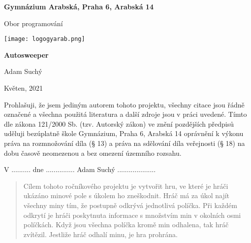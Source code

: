 
\begin{titlepage}
\begin{center}
\large \vspace*{\fill}
\thispagestyle{empty}

\LARGE

{ \huge \textbf{Gymnázium Arabská, Praha 6, Arabská 14}}

{\LARGE Obor programování }

\vfill
\texttt{[image: logogyarab.png]}
\vspace{15pt}

\vfill

{\huge \textbf{Autosweeper}}

\vfill

Adam Suchý

\vfill

{\large Květen, 2021}

\vspace*{\fill}
\end{center}
\end{titlepage}

\thispagestyle{empty}
\addtocounter{page}{-1}
\vspace*{\fill}
Prohlašuji, že jsem jediným autorem tohoto projektu, všechny citace jsou řádně označené a všechna 
použitá literatura a další zdroje jsou v práci uvedené. Tímto dle zákona 121/2000 Sb. (tzv. Autorský zákon) 
ve znění pozdějších předpisů uděluji bezúplatně škole Gymnázium, Praha 6, Arabská 14 oprávnění k výkonu 
práva na rozmnožování díla (§ 13) a práva na sdělování díla veřejnosti (§ 18) na dobu časově neomezenou a 
bez omezení územního rozsahu.
\bigskip

V .......... dne ............... \hspace{4cm} Adam Suchý ....................
\vspace{2cm}

\newpage
\begin{abstract}
    Cílem tohoto ročníkového projektu je vytvořit hru, ve které je hráči ukázáno minové pole s úkolem ho
    zneškodnit. Hráč má za úkol najít všechny miny tím, že postupně odkrývá jednotlivá políčka. Při 
    každém odkrytí je hráči poskytnuta informace s množstvím min v okolních osmi políčkách. Když jsou 
    všechna políčka kromě min odhalena, tak hráč zvítězil. Jestliže hráč odhalí minu, je hra prohrána.
\end{abstract}

\tableofcontents